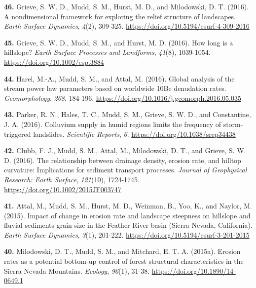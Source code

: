 \documentclass[10pt, a4paper]{article}
\newcommand{\years}[1]{\marginnote{\scriptsize #1}}
\begin{document}
\years{2016}\hangindent=0.7cm\textbf{46. }Grieve, S. W. D., Mudd, S. M., Hurst, M. D., and Milodowski, D. T. (2016). A nondimensional framework for exploring the relief structure of landscapes. \textit{Earth Surface Dynamics}, \textit{4}(2), 309-325. \href{https://doi.org/10.5194/esurf-4-309-2016}{https://doi.org/10.5194/esurf-4-309-2016}\par
\years{2016}\hangindent=0.7cm\textbf{45. }Grieve, S. W. D., Mudd, S. M., and Hurst, M. D. (2016). How long is a hillslope? \textit{Earth Surface Processes and Landforms}, \textit{41}(8), 1039-1054. \href{https://doi.org/10.1002/esp.3884}{https://doi.org/10.1002/esp.3884}\par
\years{2016}\hangindent=0.7cm\textbf{44. }Harel, M.-A., Mudd, S. M., and Attal, M. (2016). Global analysis of the stream power law parameters based on worldwide 10Be denudation rates. \textit{Geomorphology}, \textit{268}, 184-196. \href{https://doi.org/10.1016/j.geomorph.2016.05.035}{https://doi.org/10.1016/j.geomorph.2016.05.035}\par
\years{2016}\hangindent=0.7cm\textbf{43. }Parker, R. N., Hales, T. C., Mudd, S. M., Grieve, S. W. D., and Constantine, J. A. (2016). Colluvium supply in humid regions limits the frequency of storm-triggered landslides. \textit{Scientific Reports}, \textit{6}. \href{https://doi.org/10.1038/srep34438}{https://doi.org/10.1038/srep34438}\par
\years{2016}\hangindent=0.7cm\textbf{42. }Clubb, F. J., Mudd, S. M., Attal, M., Milodowski, D. T., and Grieve, S. W. D. (2016). The relationship between drainage density, erosion rate, and hilltop curvature: Implications for sediment transport processes. \textit{Journal of Geophysical Research: Earth Surface}, \textit{121}(10), 1724-1745. \href{https://doi.org/10.1002/2015JF003747}{https://doi.org/10.1002/2015JF003747}\par

\years{2015}\hangindent=0.7cm\textbf{41. }Attal, M., Mudd, S. M., Hurst, M. D., Weinman, B., Yoo, K., and Naylor, M. (2015). Impact of change in erosion rate and landscape steepness on hillslope and fluvial sediments grain size in the Feather River basin (Sierra Nevada, California). \textit{Earth Surface Dynamics}, \textit{3}(1), 201-222. \href{https://doi.org/10.5194/esurf-3-201-2015}{https://doi.org/10.5194/esurf-3-201-2015}\par
\years{2015}\hangindent=0.7cm\textbf{40. }Milodowski, D. T., Mudd, S. M., and Mitchard, E. T. A. (2015a). Erosion rates as a potential bottom-up control of forest structural characteristics in the Sierra Nevada Mountains. \textit{Ecology}, \textit{96}(1), 31-38. \href{https://doi.org/10.1890/14-0649.1}{https://doi.org/10.1890/14-0649.1}\par
\end{document}
